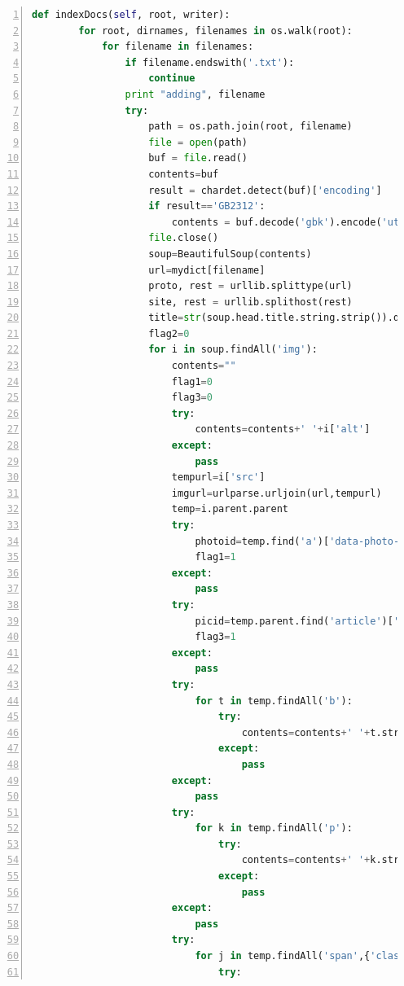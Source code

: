 \documentclass{article}
\begin{document}
\begin{lstlisting}[language=python,numbers=left,frame=leftline]
    def indexDocs(self, root, writer):
        for root, dirnames, filenames in os.walk(root):
            for filename in filenames:
                if filename.endswith('.txt'):
                    continue
                print "adding", filename
                try:
                    path = os.path.join(root, filename)
                    file = open(path)
                    buf = file.read()
                    contents=buf
                    result = chardet.detect(buf)['encoding']
                    if result=='GB2312':
                        contents = buf.decode('gbk').encode('utf8')
                    file.close()
                    soup=BeautifulSoup(contents)
                    url=mydict[filename]
                    proto, rest = urllib.splittype(url)
                    site, rest = urllib.splithost(rest)
                    title=str(soup.head.title.string.strip()).decode('utf8')
                    flag2=0
                    for i in soup.findAll('img'):
                        contents=""
                        flag1=0
                        flag3=0
                        try:
                            contents=contents+' '+i['alt']
                        except:
                            pass
                        tempurl=i['src']
                        imgurl=urlparse.urljoin(url,tempurl)
                        temp=i.parent.parent
                        try:
                            photoid=temp.find('a')['data-photo-id']
                            flag1=1
                        except:
                            pass
                        try:
                            picid=temp.parent.find('article')['id']
                            flag3=1
                        except:
                            pass
                        try:
                            for t in temp.findAll('b'):
                                try:
                                    contents=contents+' '+t.string.strip()
                                except:
                                    pass
                        except:
                            pass
                        try:
                            for k in temp.findAll('p'):
                                try:
                                    contents=contents+' '+k.string.strip()
                                except:
                                    pass
                        except:
                            pass
                        try:
                            for j in temp.findAll('span',{'class':'title'}):
                                try:

\end{lstlisting}
\end{document}
